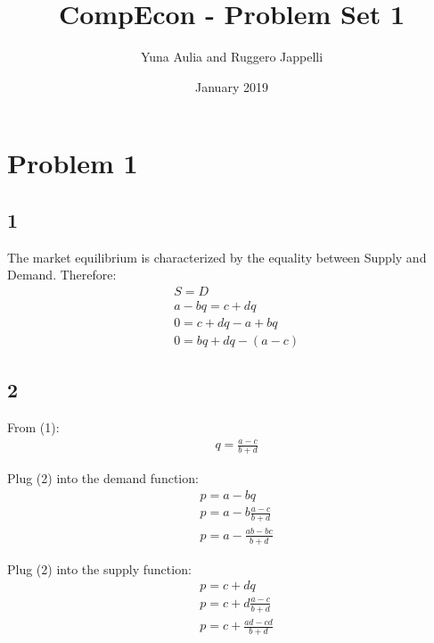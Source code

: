 \documentclass{article}
\title{CompEcon - Problem Set 1}
\author{Yuna Aulia and Ruggero Jappelli}
\date{January 2019}
\begin{document}
\maketitle

\section*{Problem 1}
\subsection*{1}
\noindent
The market equilibrium is characterized by the equality between Supply and Demand. Therefore:
\begin{equation}
\nonumber
\begin{aligned}
& S = D\\
& a - bq = c + dq\\
& 0 = c + dq - a + bq\\
& 0 = bq + dq - (a - c)
\end{aligned}
\end{equation}

\subsection*{2}
From (1):
\begin{equation}
\nonumber
\begin{aligned}
& q = \frac{a - c}{b + d}
\end{aligned}
\end{equation}

Plug (2) into the demand function:
\begin{equation}
\nonumber
\begin{aligned}
& p = a - bq\\
& p = a - b \frac{a - c}{b + d}\\
& p = a - \frac{ab - bc}{b + d}
\end{aligned}
\end{equation}

Plug (2) into the supply function:
\begin{equation}
\nonumber
\begin{aligned}
& p = c + dq\\
& p = c + d \frac{a - c}{b + d}\\
& p = c + \frac{ad - cd}{b + d}
\end{aligned}
\end{equation}
\end{document}
